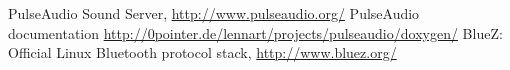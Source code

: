 \documentclass[conference]{./IEEEtran}
\begin{document}
\begin{thebibliography}{1}
		PulseAudio Sound Server, 
		\url{http://www.pulseaudio.org/}
		PulseAudio documentation
		\url{http://0pointer.de/lennart/projects/pulseaudio/doxygen/}
		BlueZ: Official Linux Bluetooth protocol stack, 
		\url{http://www.bluez.org/}



\end{thebibliography}




\end{document}
